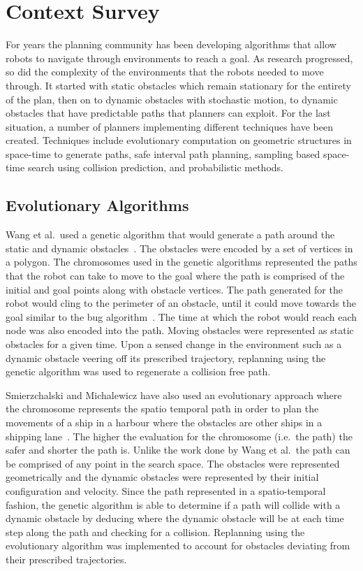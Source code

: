


\chapter{Context Survey}

\label{chapter:contextsurvey}

For years the planning community has been developing algorithms that allow
robots to navigate through environments to reach a goal. As research
progressed, so did the complexity of the environments that the robots needed to
move through. It started with static obstacles which remain stationary for the
entirety of the plan, then on to dynamic obstacles with stochastic motion, to
dynamic obstacles that have predictable paths that planners can exploit. For
the last situation, a number of planners implementing different techniques have
been created. Techniques include evolutionary computation on geometric
structures in space-time to generate paths, safe interval path planning,
sampling based space-time search using collision prediction, and probabilistic
methods.

\section{Evolutionary Algorithms}

Wang et al.\ used a genetic algorithm that would generate a path around the
static and dynamic obstacles~\cite{wang2007mobile}. The obstacles were encoded
by a set of vertices in a polygon. The chromosomes used in the genetic
algorithms represented the paths that the robot can take to move to the goal
where the path is comprised of the initial and goal points along with obstacle
vertices.  The path generated for the robot would cling to the perimeter of an
obstacle, until it could move towards the goal similar to the bug
algorithm~\cite{weir}. The time at which the robot would reach each node was
also encoded into the path. Moving obstacles were represented as static
obstacles for a given time. Upon a sensed change in the environment such as a
dynamic obstacle veering off its prescribed trajectory, replanning using the
genetic algorithm was used to regenerate a collision free path.

Smierzchalski and Michalewicz have also used an evolutionary approach where the
chromosome represents the spatio temporal path in order to plan the movements
of a ship in a harbour where the obstacles are other ships in a shipping
lane~\cite{smierzchalski2005path}. The higher the evaluation for the chromosome
(i.e.\ the path) the safer and shorter the path is. Unlike the work done by
Wang et al.\, the path can be comprised of any point in the search space.  The
obstacles were represented geometrically and the dynamic obstacles were
represented by their initial configuration and velocity.  Since the path
represented in a spatio-temporal fashion, the genetic algorithm is able to
determine if a path will collide with a dynamic obstacle by deducing where the
dynamic obstacle will be at each time step along the path and checking for a
collision.  Replanning using the evolutionary algorithm was implemented to
account for obstacles deviating from their prescribed trajectories.

